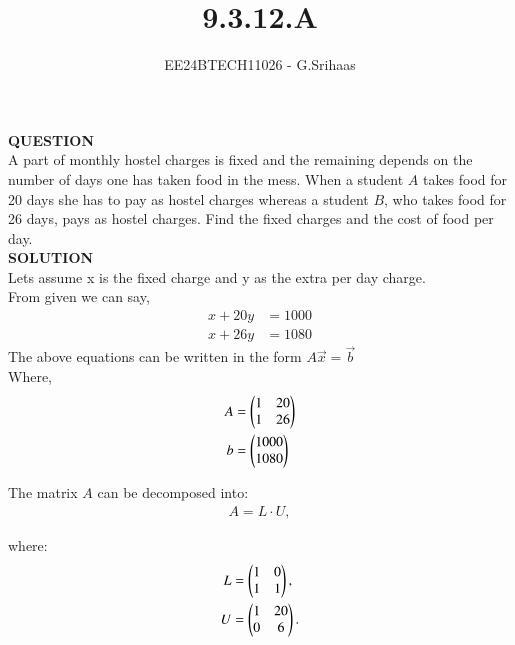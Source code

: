 \documentclass[journal]{IEEEtran}
\begin{document}

\vspace{3cm}

\title{9.3.12.A}
\author{EE24BTECH11026 - G.Srihaas}
{\let\newpage\relax\maketitle}

\renewcommand{\thefigure}{\theenumi}
\renewcommand{\thetable}{\theenumi}
\setlength{\intextsep}{10pt} %


\renewcommand{\thetable}{\theenumi}

\textbf{QUESTION} \\
A part of monthly hostel charges is fixed and the remaining depends on the
number of days one has taken food in the mess. When a student $A$
takes food for
20 days she has to pay  as hostel charges whereas a student $B$, who takes
food for 26 days, pays  as hostel charges. Find the fixed charges and the
cost of food per day.\\

\textbf{SOLUTION} \\
Lets assume x is the fixed charge and y as the extra per day charge.\\
From given we can say,
\begin{align}
    x + 20y &= 1000\\
    x + 26y &= 1080
\end{align}
The above equations can be written in the form $A\vec{x} = \vec{b}$\\
Where,
\begin{align}
A &= \begin{pmatrix} 1 & 20 \\
           1 & 26 \end{pmatrix}\\
b &=  \begin{pmatrix} 1000 \\ 1080\end{pmatrix}
\end{align}

The matrix $A$ can be decomposed into:
\begin{align}
    A = L \cdot U,
\end{align}

where:
\begin{align}
    L &= \begin{pmatrix}1 & 0 \\ 1 & 1\end{pmatrix}, \\
    U &= \begin{pmatrix}1 & 20 \\ 0 & 6\end{pmatrix}.
\end{align}
\end{document}

